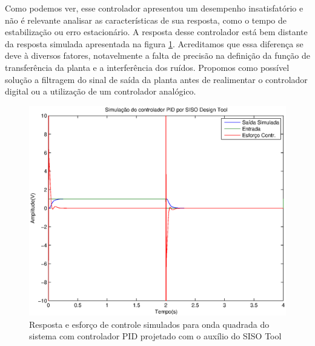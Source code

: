 \documentclass{article}
\begin{document}
   Como podemos ver, esse controlador apresentou um desempenho insatisfatório e não é relevante analisar as características de sua resposta, como o tempo de estabilização ou erro estacionário. A resposta desse controlador está bem distante da resposta simulada apresentada na figura \ref{fig:simpids}. Acreditamos que essa diferença se deve à diversos fatores, notavelmente a falta de precisão na definição da função de transferência da planta e a interferência dos ruídos. Propomos como possível solução a filtragem do sinal de saída da planta antes de realimentar o controlador digital ou a utilização de um controlador analógico.
   \begin{figure}[H]
   	\centering
   	\includegraphics[width=0.8\linewidth]{yusimpids}
   	\caption{Resposta e esforço de controle simulados para onda quadrada do sistema com controlador PID projetado com o auxílio do SISO Tool}
   	\label{fig:simpids}
   \end{figure}
  
\begin{thebibliography}{widestlabel}
\end{thebibliography}
\end{document}
